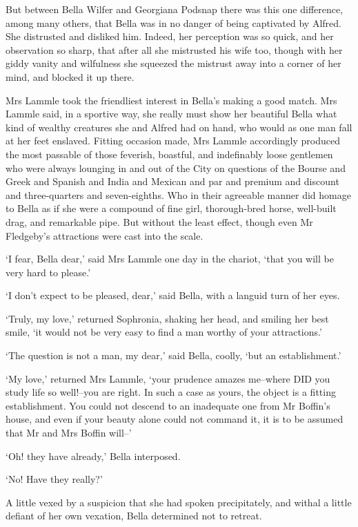 But between Bella Wilfer and Georgiana Podsnap there was this one
difference, among many others, that Bella was in no danger of being
captivated by Alfred. She distrusted and disliked him. Indeed, her
perception was so quick, and her observation so sharp, that after all
she mistrusted his wife too, though with her giddy vanity and wilfulness
she squeezed the mistrust away into a corner of her mind, and blocked it
up there.

Mrs Lammle took the friendliest interest in Bella’s making a good match.
Mrs Lammle said, in a sportive way, she really must show her beautiful
Bella what kind of wealthy creatures she and Alfred had on hand, who
would as one man fall at her feet enslaved. Fitting occasion made,
Mrs Lammle accordingly produced the most passable of those feverish,
boastful, and indefinably loose gentlemen who were always lounging in
and out of the City on questions of the Bourse and Greek and Spanish and
India and Mexican and par and premium and discount and three-quarters
and seven-eighths. Who in their agreeable manner did homage to Bella
as if she were a compound of fine girl, thorough-bred horse, well-built
drag, and remarkable pipe. But without the least effect, though even Mr
Fledgeby’s attractions were cast into the scale.

‘I fear, Bella dear,’ said Mrs Lammle one day in the chariot, ‘that you
will be very hard to please.’

‘I don’t expect to be pleased, dear,’ said Bella, with a languid turn of
her eyes.

‘Truly, my love,’ returned Sophronia, shaking her head, and smiling
her best smile, ‘it would not be very easy to find a man worthy of your
attractions.’

‘The question is not a man, my dear,’ said Bella, coolly, ‘but an
establishment.’

‘My love,’ returned Mrs Lammle, ‘your prudence amazes me--where DID you
study life so well!--you are right. In such a case as yours, the object
is a fitting establishment. You could not descend to an inadequate one
from Mr Boffin’s house, and even if your beauty alone could not command
it, it is to be assumed that Mr and Mrs Boffin will--’

‘Oh! they have already,’ Bella interposed.

‘No! Have they really?’

A little vexed by a suspicion that she had spoken precipitately, and
withal a little defiant of her own vexation, Bella determined not to
retreat.

